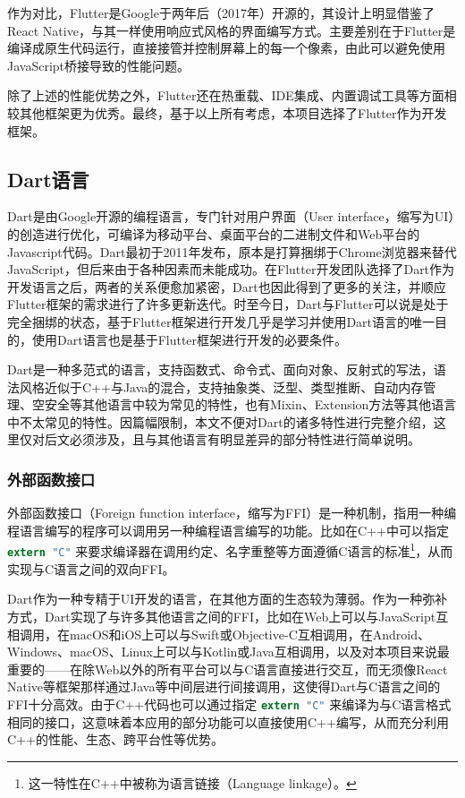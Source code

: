作为对比，Flutter是Google于两年后（2017年）开源的，其设计上明显借鉴了React Native，与其一样使用响应式风格的界面编写方式。主要差别在于Flutter是编译成原生代码运行，直接接管并控制屏幕上的每一个像素，由此可以避免使用JavaScript桥接导致的性能问题。

除了上述的性能优势之外，Flutter还在热重载、IDE集成、内置调试工具等方面相较其他框架更为优秀。最终，基于以上所有考虑，本项目选择了Flutter作为开发框架。

\subsection{Dart语言}\label{subsec:dart}

Dart是由Google开源的编程语言，专门针对用户界面（User interface，缩写为UI）的创造进行优化，可编译为移动平台、桌面平台的二进制文件和Web平台的Javascript代码\cite{DartProgrammingLanguage}。Dart最初于2011年发布，原本是打算捆绑于Chrome浏览器来替代JavaScript，但后来由于各种因素而未能成功。在Flutter开发团队选择了Dart作为开发语言之后，两者的关系便愈加紧密，Dart也因此得到了更多的关注，并顺应Flutter框架的需求进行了许多更新迭代。时至今日，Dart与Flutter可以说是处于完全捆绑的状态，基于Flutter框架进行开发几乎是学习并使用Dart语言的唯一目的，使用Dart语言也是基于Flutter框架进行开发的必要条件。

Dart是一种多范式的语言，支持函数式、命令式、面向对象、反射式的写法，语法风格近似于C++与Java的混合，支持抽象类、泛型、类型推断、自动内存管理、空安全等其他语言中较为常见的特性，也有Mixin、Extension方法等其他语言中不太常见的特性。因篇幅限制，本文不便对Dart的诸多特性进行完整介绍，这里仅对后文必须涉及，且与其他语言有明显差异的部分特性进行简单说明。

\subsubsection{外部函数接口}\label{subsubsec:ffi}

外部函数接口（Foreign function interface，缩写为FFI）是一种机制，指用一种编程语言编写的程序可以调用另一种编程语言编写的功能。比如在C++中可以指定 \lstinline[language=C]{extern "C"} 来要求编译器在调用约定、名字重整等方面遵循C语言的标准\footnote{这一特性在C++中被称为语言链接（Language linkage）。}，从而实现与C语言之间的双向FFI。

Dart作为一种专精于UI开发的语言，在其他方面的生态较为薄弱。作为一种弥补方式，Dart实现了与许多其他语言之间的FFI，比如在Web上可以与JavaScript互相调用，在macOS和iOS上可以与Swift或Objective-C互相调用，在Android、Windows、macOS、Linux上可以与Kotlin或Java互相调用，以及对本项目来说最重要的——在除Web以外的所有平台可以与C语言直接进行交互，而无须像React Native等框架那样通过Java等中间层进行间接调用，这使得Dart与C语言之间的FFI十分高效。由于C++代码也可以通过指定 \lstinline[language=C]{extern "C"} 来编译为与C语言格式相同的接口，这意味着本应用的部分功能可以直接使用C++编写，从而充分利用C++的性能、生态、跨平台性等优势。

